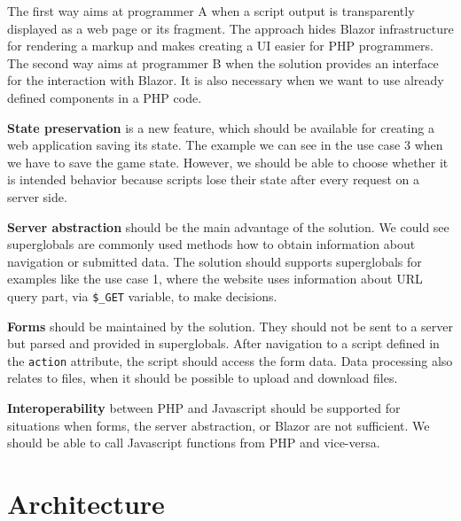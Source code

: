 The first way aims at programmer A when a script output is transparently displayed as a web page or its fragment.
The approach hides Blazor infrastructure for rendering a markup and makes creating a UI easier for PHP programmers.
The second way aims at programmer B when the solution provides an interface for the interaction with Blazor.
It is also necessary when we want to use already defined components in a PHP code.
\par
{}
\textbf{State preservation} is a new feature, which should be available for creating a web application saving its state.
The example we can see in the use case 3 when we have to save the game state.
However, we should be able to choose whether it is intended behavior because scripts lose their state after every request on a server side.
\par
{}
\textbf{Server abstraction} should be the main advantage of the solution.
We could see superglobals are commonly used methods how to obtain information about navigation or submitted data.
The solution should supports superglobals for examples like the use case 1, where the website uses information about URL query part, via \texttt{\$\_GET} variable, to make decisions.
\par
\textbf{Forms} should be maintained by the solution. 
They should not be sent to a server but parsed and provided in superglobals. 
After navigation to a script defined in the \texttt{action} attribute, the script should access the form data.
Data processing also relates to files, when it should be possible to upload and download files.
\par
\textbf{Interoperability} between PHP and Javascript should be supported for situations when forms, the server abstraction, or Blazor are not sufficient.
We should be able to call Javascript functions from PHP and vice-versa.

\section{Architecture}

